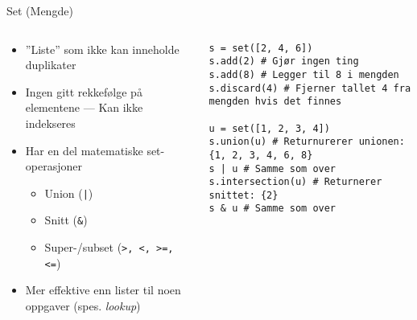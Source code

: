 \documentclass[screen, aspectratio=169]{beamer}
\begin{document}
\begin{frame}[fragile]{Set (Mengde)}
    \begin{columns}
    \begin{column}{.4\textwidth}
        \begin{itemize}
            \item ''Liste'' som ikke kan inneholde duplikater
            \item Ingen gitt rekkefølge på elementene --- Kan ikke indekseres
            \item Har en del matematiske set-operasjoner
            \begin{itemize}
                \item Union (\lstinline{|})
                \item Snitt (\lstinline|&|)
                \item Super-/subset (\lstinline|>, <, >=, <=|)
            \end{itemize}
            \item Mer effektive enn lister til noen oppgaver (spes. \textit{lookup})
        \end{itemize}
    \end{column}
    \begin{column}{.6\textwidth}
        \begin{lstlisting}
s = set([2, 4, 6])
s.add(2) # Gjør ingen ting
s.add(8) # Legger til 8 i mengden
s.discard(4) # Fjerner tallet 4 fra mengden hvis det finnes

u = set([1, 2, 3, 4])
s.union(u) # Returnurerer unionen: {1, 2, 3, 4, 6, 8}
s | u # Samme som over
s.intersection(u) # Returnerer snittet: {2}
s & u # Samme som over
        \end{lstlisting}
    \end{column}
    \end{columns}
\end{frame}
\end{document}
